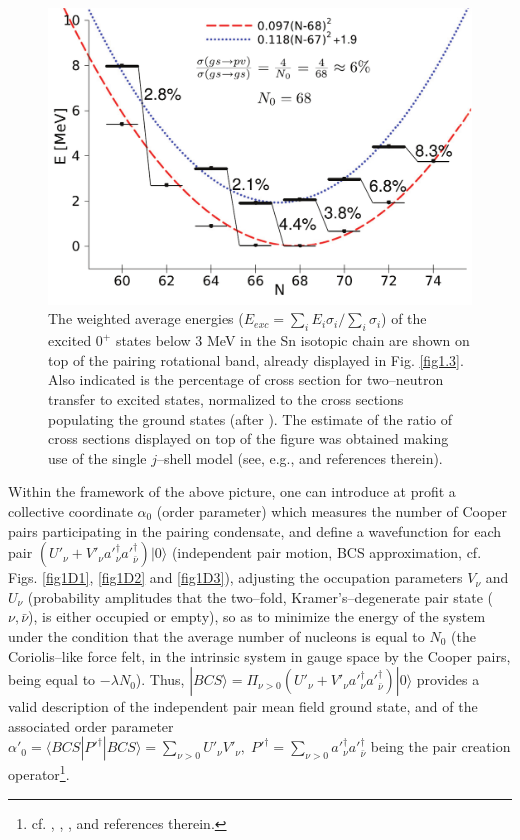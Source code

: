   \begin{figure}
  \centerline{\includegraphics*[width=\textwidth,angle=0]{nutshell/figs/fig2_1_4.pdf}}
  \caption{The weighted average energies ($E_{exc}=\sum_i E_i \sigma_i/\sum_i \sigma_i$) of the excited $0^+$ states below 3 MeV in the Sn isotopic chain are shown on top of the pairing rotational band, already displayed in Fig. \ref{fig1.3}. Also indicated is the percentage of cross section for two--neutron transfer to excited states, normalized to the cross sections populating the ground states (after \cite{Potel:13b}). The estimate of the ratio of cross sections displayed on top of the figure was obtained making use of the single $j$--shell model (see, e.g., \cite{Brink:05} and references therein).}\label{fig1.4}
  \end{figure}
Within the framework of the above picture, one can introduce at profit a collective coordinate $\alpha_0$ (order parameter) which measures the number of Cooper pairs participating in the pairing condensate, and define a wavefunction for each pair $\left(U'_\nu+V'_\nu a'^\dagger_\nu a'^\dagger_{\bar\nu}\right)|0\rangle$ (independent pair motion, BCS approximation, cf. Figs. \ref{fig1D1}, \ref{fig1D2} and \ref{fig1D3}), adjusting the occupation parameters $V_\nu$ and $U_\nu$ (probability amplitudes that the two--fold, Kramer's--degenerate pair state ($\nu,\bar{\nu}$), is either occupied or empty), so as to minimize the energy of the system under the condition that the average number of nucleons is equal to $N_0$ (the Coriolis--like force felt, in the intrinsic system in gauge space by the Cooper pairs, being equal to $-\lambda N_0$). Thus, $|BCS\rangle=\Pi_{\nu>0}\left(U'_\nu+V'_\nu a'^\dagger_\nu a'^\dagger_{\bar\nu}\right)|0\rangle$ provides a valid description of the independent pair mean field ground state, and of the associated order parameter $\alpha'_0=\langle BCS|P'^{\dagger}|BCS\rangle=\sum_{\nu>0}U'_\nu V'_\nu,\; P'^{\dagger}=\sum_{\nu>0}a'^\dagger_\nu a'^\dagger_{\bar \nu}$ being the pair creation operator\footnote{cf. \cite{Bardeen:57a}, \cite{Bardeen:57b}, \cite{Schrieffer:64}, \cite{Schrieffer:73} and references therein.}.
